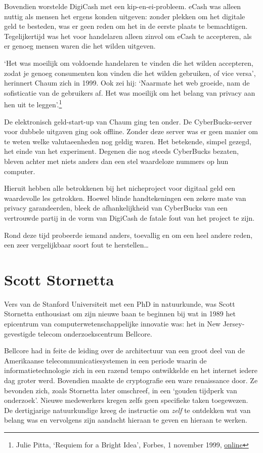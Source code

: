 \documentclass[
  a5paper,
  smalldemyvopaper,11pt,twoside,onecolumn,openright,extrafontsizes]{memoir}
\begin{document}
Bovendien worstelde DigiCash met een kip-en-ei-probleem. eCash was
alleen nuttig als mensen het ergens konden uitgeven: zonder plekken om
het digitale geld te besteden, was er geen reden om het in de eerste
plaats te bemachtigen. Tegelijkertijd was het voor handelaren alleen
zinvol om eCash te accepteren, als er genoeg mensen waren die het wilden
uitgeven.

`Het was moeilijk om voldoende handelaren te vinden die het wilden
accepteren, zodat je genoeg consumenten kon vinden die het wilden
gebruiken, of vice versa', herinnert Chaum zich in 1999. Ook zei hij:
`Naarmate het web groeide, nam de sofisticatie van de gebruikers af. Het
was moeilijk om het belang van privacy aan hen uit te
leggen'.\footnote{Julie Pitta, `Requiem for a Bright Idea', Forbes, 1
  november 1999,
  \href{https://www.forbes.com/forbes/1999/1101/6411390a.html}{online}}

De elektronisch geld-start-up van Chaum ging ten onder. De
CyberBucks-server voor dubbele uitgaven ging ook offline. Zonder deze
server was er geen manier om te weten welke valutaeenheden nog geldig
waren. Het betekende, simpel gezegd, het einde van het experiment.
Degenen die nog steeds CyberBucks bezaten, bleven achter met niets
anders dan een stel waardeloze nummers op hun computer.

Hieruit hebben alle betrokkenen bij het nicheproject voor digitaal geld
een waardevolle les getrokken. Hoewel blinde handtekeningen een zekere
mate van privacy garandeerden, bleek de afhankelijkheid van CyberBucks
van een vertrouwde partij in de vorm van DigiCash de fatale fout van het
project te zijn.

Rond deze tijd probeerde iemand anders, toevallig en om een heel andere
reden, een zeer vergelijkbaar soort fout te herstellen\ldots{}

\section{Scott Stornetta}\label{scott-stornetta}

Vers van de Stanford Universiteit met een PhD in natuurkunde, was Scott
Stornetta enthousiast om zijn nieuwe baan te beginnen bij wat in 1989
het epicentrum van computerwetenschappelijke innovatie was: het in New
Jersey-gevestigde telecom onderzoekscentrum Bellcore.

Bellcore had in feite de leiding over de architectuur van een groot deel
van de Amerikaanse telecommunicatiesystemen in een periode waarin de
informatietechnologie zich in een razend tempo ontwikkelde en het
internet iedere dag groter werd. Bovendien maakte de cryptografie een
ware renaissance door. Ze bevonden zich, zoals Stornetta later
omschreef, in een `gouden tijdperk van onderzoek'. Nieuwe medewerkers
kregen zelfs geen specifieke taken toegewezen. De dertigjarige
natuurkundige kreeg de instructie om \emph{zelf} te ontdekken wat van
belang was en vervolgens zijn aandacht hieraan te geven en hieraan te
werken.
\end{document}
